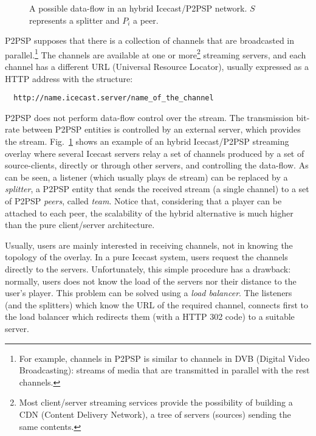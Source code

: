 \label{sec:TTS}

\begin{figure}
   \caption{A possible data-flow in an
  hybrid Icecast/P2PSP network. $S$ represents a splitter and $P_i$ a
  peer.\label{fig:icecast-P2PSP}}
\end{figure}

P2PSP supposes that there is a collection of channels that are
broadcasted in parallel.\footnote{For example, channels in P2PSP is
  similar to channels in DVB (Digital Video Broadcasting): streams of
  media that are transmitted in parallel with the rest channels.} The
channels are available at one or more\footnote{Most client/server
  streaming services provide the possibility of building a CDN
  (Content Delivery Network), a tree of servers (sources) sending the
  same contents.} streaming servers, and each channel has a different
URL (Universal Resource Locator), usually expressed as a HTTP
address with the structure:
\begin{verbatim}
  http://name.icecast.server/name_of_the_channel
\end{verbatim}

P2PSP does not perform data-flow control over the stream. The
transmission bit-rate between P2PSP entities is controlled by an
external server, which provides the
stream. Fig.~\ref{fig:icecast-P2PSP} shows an example of an hybrid
Icecast/P2PSP streaming overlay where several Icecast servers relay a
set of channels produced by a set of source-clients, directly or
through other servers, and controlling the data-flow. As can be seen,
a listener (which usually plays de stream) can be replaced by a
\emph{splitter}, a P2PSP entity that sends the received stream (a
single channel) to a set of P2PSP \emph{peers}, called
\emph{team}. Notice that, considering that a player can be attached to
each peer, the scalability of the hybrid alternative is much higher
than the pure client/server architecture.


Usually, users are mainly interested in receiving channels, not in
knowing the topology of the overlay. In a pure Icecast system, users
request the channels directly to the servers. Unfortunately, this
simple procedure has a drawback: normally, users does not know the
load of the servers nor their distance to the user's player. This
problem can be solved using a \emph{load balancer}. The listeners (and
the splitters) which know the URL of the required channel, connects
first to the load balancer which redirects them (with a HTTP 302 code)
to a suitable server.

